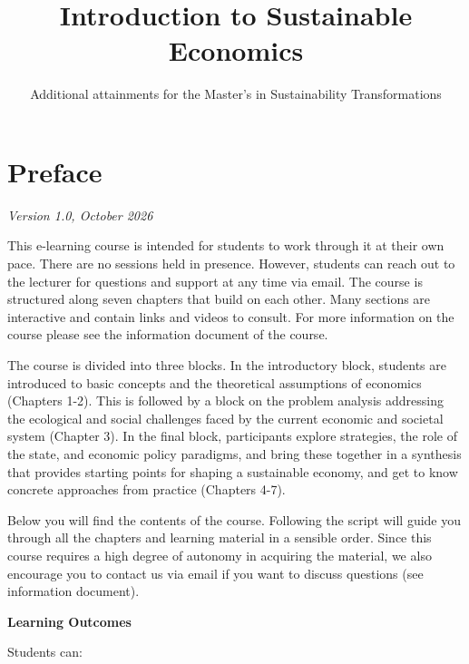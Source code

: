 \documentclass[
  british,
  a4paper,
  DIV=11,
  numbers=noendperiod,
  oneside,
  openany]{scrreprt}
\title{Introduction to Sustainable Economics}
\subtitle{Additional attainments for the Master's in Sustainability
Transformations}
\author{}
\date{}
\renewcommand*\contentsname{Table of contents}
\newcommand\contentsname{Table of contents}
\begin{document}
\maketitle

\renewcommand*\contentsname{Table of contents}
{
\setcounter{tocdepth}{2}
\tableofcontents
}


\chapter*{Preface}\label{preface}


\emph{Version 1.0, October 2026}

This e-learning course is intended for students to work through it at
their own pace. There are no sessions held in presence. However,
students can reach out to the lecturer for questions and support at any
time via email. The course is structured along seven chapters that build
on each other. Many sections are interactive and contain links and
videos to consult. For more information on the course please see the
information document of the course.

The course is divided into three blocks. In the introductory block,
students are introduced to basic concepts and the theoretical
assumptions of economics (Chapters 1-2). This is followed by a block on
the problem analysis addressing the ecological and social challenges
faced by the current economic and societal system (Chapter 3). In the
final block, participants explore strategies, the role of the state, and
economic policy paradigms, and bring these together in a synthesis that
provides starting points for shaping a sustainable economy, and get to
know concrete approaches from practice (Chapters 4-7).

Below you will find the contents of the course. Following the script
will guide you through all the chapters and learning material in a
sensible order. Since this course requires a high degree of autonomy in
acquiring the material, we also encourage you to contact us via email if
you want to discuss questions (see information document).

\textbf{Learning Outcomes}

Students can:
\end{document}
